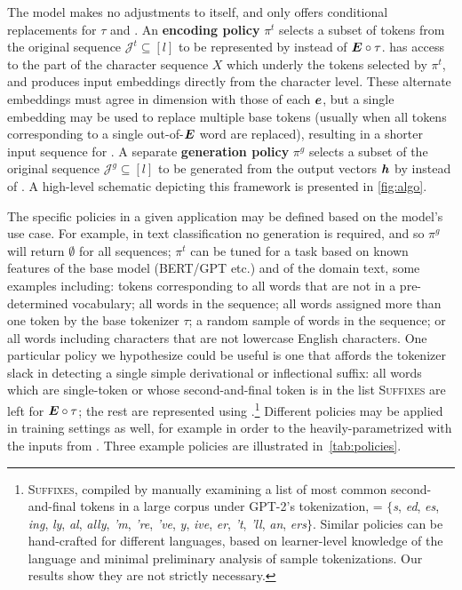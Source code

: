 The \tokdetok{} model makes no adjustments to \mmod{} itself, and only offers conditional replacements for $\tau$ and \gen{}.
An \textbf{encoding policy} $\pi^t$ selects a subset of tokens from the original sequence $\mathcal{J}^t\subseteq [l]$ to be represented by \tok{} instead of $\bm{E} \circ \tau$.
\tok{} has access to the part of the character sequence $X$ which underly the tokens selected by $\pi^t$, and produces input embeddings directly from the character level.
These alternate embeddings must agree in dimension with those of each $\bm{e}$, but a single embedding may be used to replace multiple base tokens (usually when all tokens corresponding to a single out-of-$\bm{E}$ word are replaced), resulting in a shorter input sequence for \mmod{}.
A separate \textbf{generation policy} $\pi^g$ selects a subset of the original sequence $\mathcal{J}^g\subseteq [l]$ to be generated from the output vectors $\bm{h}$ by \detok{} instead of \gen{}.
A high-level schematic depicting this framework is presented in \autoref{fig:algo}.



The specific policies in a given application may be defined based on the model's use case.
For example, in text classification no generation is required, and so $\pi^g$ will return $\emptyset$ for all sequences; $\pi^t$ can be tuned for a task based on known features of the base model (BERT/GPT etc.) and of the domain text, some examples including:
tokens corresponding to all words that are not in a pre-determined vocabulary;
all words in the sequence;
all words assigned more than one token by the base tokenizer $\tau$;
a random sample of words in the sequence;
or all words including characters that are not lowercase English characters.
One particular policy we hypothesize could be useful is one that affords the tokenizer slack in detecting a single simple derivational or inflectional suffix: all words which are single-token or whose second-and-final token is in the list \textsc{Suffixes} are left for $\bm{E} \circ \tau$; the rest are represented using \tok.\footnote{\textsc{Suffixes}, compiled by manually examining a list of most common second-and-final tokens in a large corpus under GPT-2's tokenization, = $\{$\emph{s}, \emph{ed}, \emph{es}, \emph{ing}, \emph{ly}, \emph{al}, \emph{ally}, \emph{'m}, \emph{'re}, \emph{'ve}, \emph{y}, \emph{ive}, \emph{er}, \emph{'t}, \emph{'ll}, \emph{an}, \emph{ers}$\}$.
Similar policies can be hand-crafted for different languages, based on learner-level knowledge of the language and minimal preliminary analysis of sample tokenizations. Our results show they are not strictly necessary.}
Different policies may be applied in training settings as well, for example in order to  the heavily-parametrized \mmod{} with the inputs from \tok{}.
Three example policies are illustrated in~\autoref{tab:policies}.



